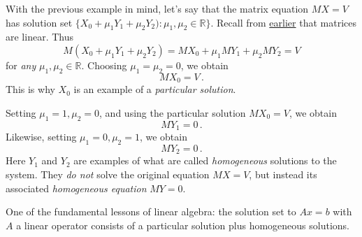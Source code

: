 %
%
With the previous example in mind, let's say that the matrix equation $MX=V$ has  solution set  $\{ X_0 + \mu_1 Y_1 + \mu_2 Y_2):\mu_1,\mu_2 \in {\mathbb R} \}$.
Recall from \hyperlink{{Matrices are linear operators}}{earlier} that matrices are linear.
%
%
Thus 
\[M( X_0 + \mu_1 Y_1 + \mu_2 Y_2)  = MX_0 + \mu_1MY_1 + \mu_2MY_2 =V\]
for \emph{any} $\mu_1, \mu_2 \in \mathbb{R}$. 
Choosing $\mu_1=\mu_2=0$, we obtain 
\[MX_0=V\, .\]  
This is why $X_0$ is an example of a  \emph{particular solution}.

Setting $\mu_1=1, \mu_2=0$, and using the particular solution $MX_0=V$, we obtain 
\[MY_1=0\, .\] 
Likewise, setting $\mu_1=0, \mu_2=1$, we obtain \[MY_2=0\, .\]
Here $Y_1$ and $Y_2$ are examples of what are called  \emph{homogeneous} solutions to the system.
They {\itshape do not} solve the original equation $MX=V$, but instead its associated 
{\itshape homogeneous  equation} $M Y =0$.

One of the fundamental lessons of linear algebra: the  solution set to $Ax=b$ with $A$ a linear operator consists of a particular solution plus homogeneous solutions.

\begin{center}
\end{center}

